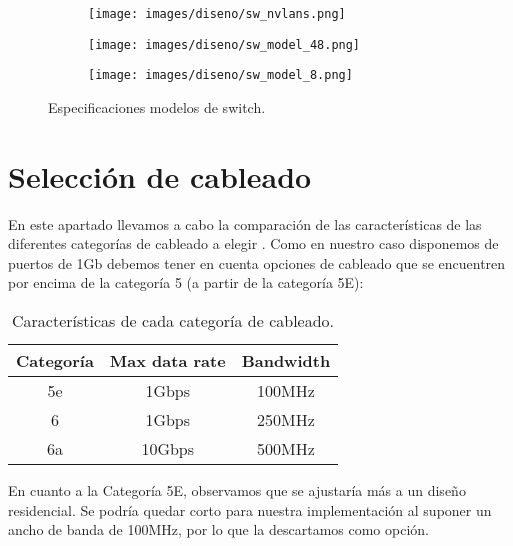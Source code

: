     \begin{figure}[h]
        \begin{subfigure}[b]{\textwidth}
            \centering
            \texttt{[image: images/diseno/sw\_nvlans.png]}
        \end{subfigure}
        \begin{subfigure}[b]{\textwidth}
            \centering
            \texttt{[image: images/diseno/sw\_model\_48.png]}
            
        \end{subfigure}
        \begin{subfigure}[b]{\textwidth}
            \centering
            \texttt{[image: images/diseno/sw\_model\_8.png]} 
        \end{subfigure}
    	\caption{Especificaciones modelos de switch.}
    	\label{fig:specs}
    \end{figure}


\section{Selección de cableado}

En este apartado llevamos a cabo la comparación de las características de las diferentes categorías de cableado a elegir \cite{cableado1} \cite{cableado2}. Como en nuestro caso disponemos de puertos de 1Gb debemos tener en cuenta opciones de cableado que se encuentren por encima de la categoría 5 (a partir de la categoría 5E):

\vspace{2mm}

\begin{table}[h]
\centering
\begin{tabular}{|c|c|c|}
\hline
Categoría & Max data rate & Bandwidth \\ \hline
5e & 1Gbps & 100MHz \\ \hline
6 & 1Gbps & 250MHz \\ \hline
6a & 10Gbps & 500MHz \\ \hline
\end{tabular}
\caption{Características de cada categoría de cableado.}
\end{table}

\vspace{2mm}

En cuanto a la Categoría 5E, observamos que se ajustaría más a un diseño residencial. Se podría quedar corto para nuestra implementación al suponer un ancho de banda de 100MHz, por lo que la descartamos como opción.

